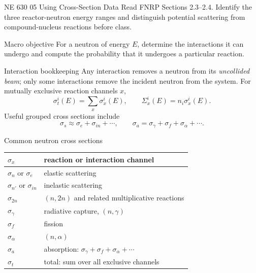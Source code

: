
\HandoutSetup
  {NE 630}
  {05}
  {Using Cross-Section Data}
  {Read FNRP Sections 2.3--2.4. Identify the three reactor-neutron energy ranges and distinguish potential scattering from compound-nucleus reactions before class.}


\MakeHandoutTitle

\begin{handoutcolumns}

\begin{fixedbox}{Macro objective}
For a neutron of energy $E$, determine the interactions it can undergo and
compute the probability that it undergoes a particular reaction.
\end{fixedbox}



\begin{fixedbox}{Interaction bookkeeping}
Any interaction removes a neutron from its \emph{uncollided beam}; only some
interactions remove the incident neutron from the system.  For mutually
exclusive reaction channels $x$,
\[
 \sigma_t^i(E)=\sum_x\sigma_x^i(E),
 \qquad
 \Sigma_x^i(E)=n_i\sigma_x^i(E).
\]
Useful grouped cross sections include
\[
 \sigma_s\approx\sigma_e+\sigma_{in}+\cdots,
 \qquad
 \sigma_a=\sigma_\gamma+\sigma_f+\sigma_\alpha+\cdots.
\]
\end{fixedbox}

\begin{fixedbox}{Common neutron cross sections}
\scriptsize
\begin{tabularx}{\linewidth}{@{}l X@{}}
\toprule
$\sigma_x$ & reaction or interaction channel \\
\midrule
$\sigma_n$ or $\sigma_e$ & elastic scattering \\
$\sigma_{n'}$ or $\sigma_{in}$ & inelastic scattering \\
$\sigma_{2n}$ & $(n,2n)$ and related multiplicative reactions \\
\midrule
$\sigma_\gamma$ & radiative capture, $(n,\gamma)$ \\
$\sigma_f$ & fission \\
$\sigma_\alpha$ & $(n,\alpha)$ \\
$\sigma_a$ & absorption: $\sigma_\gamma+\sigma_f+\sigma_\alpha+\cdots$ \\
\midrule
$\sigma_t$ & total: sum over all exclusive channels \\
\bottomrule
\end{tabularx}
\normalsize
\end{fixedbox}


\end{handoutcolumns}

